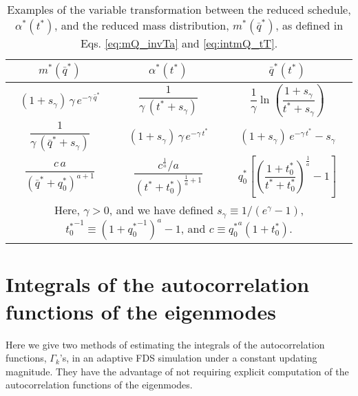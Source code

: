 \documentclass[reprint, superscriptaddress, floatfix]{revtex4-1}
\begin{document}
\begin{table}[h]
  \caption{\label{tab:m_and_a}
    Examples of the variable transformation between the
    reduced schedule, $\alpha^*(t^*)$,
    and the reduced mass distribution, $m^*(\bar q^*)$,
    as defined in Eqs. \eqref{eq:mQ_invTa}
    and \eqref{eq:intmQ_tT}.
  }
  \setlength{\tabcolsep}{2pt} %
  \renewcommand\arraystretch{2.0} %
  \begin{tabular} { c c c }
    \hline
    $m^*(\bar q^*)$ &
    $\alpha^*(t^*)$ &
    $\bar q^*(t^*)$
    \\
    \hline
    $(1+ s_\gamma) \, \gamma \, e^{-\gamma \, {\bar q}^*}$ &
    $\dfrac{1}{ \gamma \, (t^* + s_\gamma) }$ &
    $\dfrac{1}{\gamma} \ln\left(\dfrac{1 + s_\gamma}{t^* + s_\gamma} \right)$
    \\
    $\dfrac{1}{\gamma \, ({\bar q}^* + s_\gamma) }$ &
    $(1 + s_\gamma) \, \gamma \, e^{-\gamma \, t^*}$ &
    $(1 + s_\gamma) \, e^{-\gamma \, t^*} - s_\gamma$
    \\
    $\dfrac{c \, a}{\left( {\bar q}^* + q^*_0 \right)^{a+1}}$ &
    $\dfrac{c^{\frac 1 a} / a}{\left( t^* + t^*_0 \right)^{\frac{1}{a}+1}}$ &
    $q^*_0 \left[\left( \dfrac{1+t^*_0}{t^* + t^*_0} \right)^{\!\frac{1}{a}} \!- 1\right]$
    \\
    \hline
    \multicolumn{3}{p{8cm}}{
    Here,
    $\gamma > 0$,
    and we have defined
    $s_\gamma \equiv 1/(e^\gamma - 1)$,
    ${t^*_0}^{-1} \equiv \left(1+{q^*_0}^{-1}\right)^a - 1$,
    and
    $c \equiv {q^*_0}^a(1 + t^*_0)$.
    } \\
    \hline
  \end{tabular}
\end{table}




\section{\label{sec:Gamma_measure}
Integrals of the autocorrelation functions of the eigenmodes
}



Here we give two methods of estimating
the integrals of the autocorrelation functions, $\Gamma_k$'s,
in an adaptive FDS simulation
under a constant updating magnitude.
%
They have the advantage of not requiring
explicit computation of
the autocorrelation functions of the eigenmodes.
\end{document}
